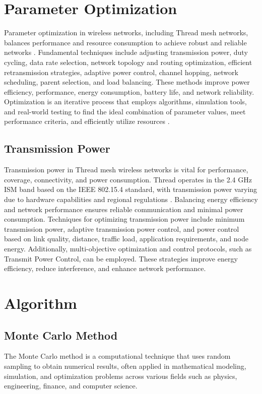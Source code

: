 \section{Parameter Optimization}\label{sec:parameter_optimization}
Parameter optimization in wireless networks, including Thread mesh networks, balances performance and resource consumption to achieve robust and reliable networks \cite{Dave_Optimization_2006}. Fundamental techniques include adjusting transmission power, duty cycling, data rate selection, network topology and routing optimization, efficient retransmission strategies, adaptive power control, channel hopping, network scheduling, parent selection, and load balancing. These methods improve power efficiency, performance, energy consumption, battery life, and network reliability. Optimization is an iterative process that employs algorithms, simulation tools, and real-world testing to find the ideal combination of parameter values, meet performance criteria, and efficiently utilize resources \cite{butler_wifi}.

\subsection{Transmission Power}
Transmission power in Thread mesh wireless networks is vital for performance, coverage, connectivity, and power consumption. Thread operates in the 2.4 GHz ISM band based on the IEEE 802.15.4 standard, with transmission power varying due to hardware capabilities and regional regulations \cite{semiconductor_nrf52840_2018_1}. Balancing energy efficiency and network performance ensures reliable communication and minimal power consumption. Techniques for optimizing transmission power include minimum transmission power, adaptive transmission power control, and power control based on link quality, distance, traffic load, application requirements, and node energy. Additionally, multi-objective optimization and control protocols, such as Transmit Power Control, can be employed. These strategies improve energy efficiency, reduce interference, and enhance network performance.


\section{Algorithm}\label{sec:algorithm}

\subsection{Monte Carlo Method}
The Monte Carlo method is a computational technique that uses random sampling to obtain numerical results, often applied in mathematical modeling, simulation, and optimization problems across various fields such as physics, engineering, finance, and computer science.


